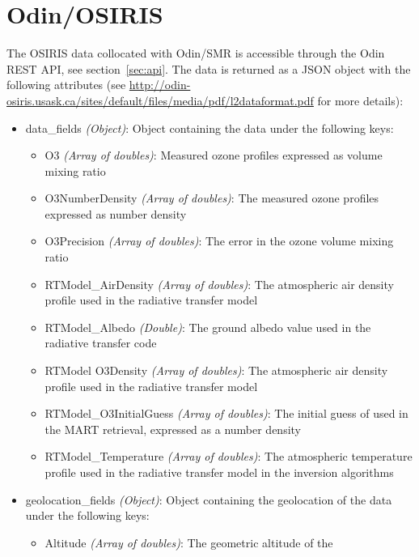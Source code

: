 \section{Odin/OSIRIS}
The OSIRIS data collocated with Odin/SMR is accessible through the Odin REST
API, see section~\ref{sec:api}. The data is returned as a JSON object with the
following attributes (see \url{http://odin-osiris.usask.ca/sites/default/files/media/pdf/l2dataformat.pdf}
for more details):
\begin{itemize}
    \item data\_fields \emph{(Object)}: Object containing the data under the
        following keys:
        \begin{itemize}
            \item O3                     \emph{(Array of doubles)}: Measured ozone profiles
                expressed as volume mixing ratio
            \item O3NumberDensity        \emph{(Array of doubles)}: The measured ozone profiles
                expressed as number density
            \item O3Precision            \emph{(Array of doubles)}: The error in the ozone volume
                mixing ratio
            \item RTModel\_AirDensity     \emph{(Array of doubles)}: The atmospheric air density
                profile used in the radiative transfer model
            \item RTModel\_Albedo         \emph{(Double)}: The ground albedo value used in the
                radiative transfer code
            \item RTModel O3Density      \emph{(Array of doubles)}: The atmospheric air density
                profile used in the radiative transfer model
            \item RTModel\_O3InitialGuess \emph{(Array of doubles)}: The initial guess of 
                used in the MART retrieval, expressed as a number density
            \item RTModel\_Temperature    \emph{(Array of doubles)}: The atmospheric temperature
                profile used in the radiative transfer model in the inversion algorithms
        \end{itemize}
    \item geolocation\_fields \emph{(Object)}: Object containing the
        geolocation of the data under the following keys:
        \begin{itemize}
            \item Altitude              \emph{(Array of doubles)}: The geometric altitude of the

\end{itemize}
\end{itemize}
